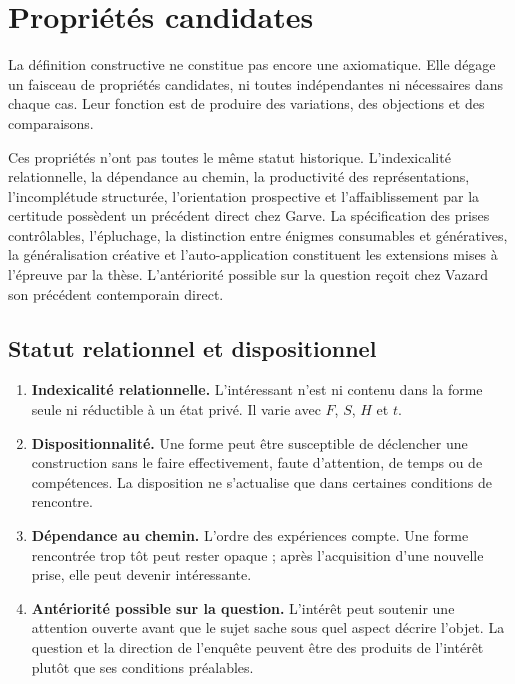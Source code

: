 \documentclass[11pt,a4paper]{article}
\begin{document}
\section{Propriétés candidates}

La définition constructive ne constitue pas encore une axiomatique. Elle dégage
un faisceau de propriétés candidates, ni toutes indépendantes ni nécessaires
dans chaque cas. Leur fonction est de produire des variations, des objections
et des comparaisons.

Ces propriétés n'ont pas toutes le même statut historique. L'indexicalité
relationnelle, la dépendance au chemin, la productivité des représentations,
l'incomplétude structurée, l'orientation prospective et l'affaiblissement par
la certitude possèdent un précédent direct chez Garve. La spécification des
prises contrôlables, l'épluchage, la distinction entre énigmes consumables et
génératives, la généralisation créative et l'auto-application constituent les
extensions mises à l'épreuve par la thèse. L'antériorité possible sur la
question reçoit chez Vazard son précédent contemporain direct.

\subsection{Statut relationnel et dispositionnel}

\begin{enumerate}
  \item \textbf{Indexicalité relationnelle.} L'intéressant n'est ni contenu
        dans la forme seule ni réductible à un état privé. Il varie avec
        \(F\), \(S\), \(H\) et \(t\).
  \item \textbf{Dispositionnalité.} Une forme peut être susceptible de
        déclencher une construction sans le faire effectivement, faute
        d'attention, de temps ou de compétences. La disposition ne s'actualise
        que dans certaines conditions de rencontre.
  \item \textbf{Dépendance au chemin.} L'ordre des expériences compte. Une
        forme rencontrée trop tôt peut rester opaque ; après l'acquisition
        d'une nouvelle prise, elle peut devenir intéressante.
  \item \textbf{Antériorité possible sur la question.} L'intérêt peut soutenir
        une attention ouverte avant que le sujet sache sous quel aspect décrire
        l'objet. La question et la direction de l'enquête peuvent être des
        produits de l'intérêt plutôt que ses conditions préalables.
\end{enumerate}
\end{document}
